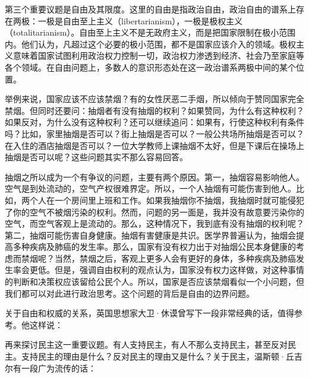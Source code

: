 第三个重要议题是自由及其限度。这里的自由是指政治自由，政治自由的谱系上存在两极：一极是自由至上主义（libertarianism），一极是极权主义（totalitarianism）。自由至上主义不是无政府主义，而是把国家限制在极小范围内。他们认为，凡超过这个必要的极小范围，都不是国家应该介入的领域。极权主义意味着国家试图利用政治权力控制一切，政治权力渗透到经济、社会乃至家庭等各个领域。在自由问题上，多数人的意识形态处在这一政治谱系两极中间的某个位置。

举例来说，国家应该不应该禁烟？有的女性厌恶二手烟，所以倾向于赞同国家完全禁烟。但同时还要问：抽烟者有没有抽烟的权利？如果赞同，为什么有这种权利？如果反对，为什么没有这种权利？还可以继续追问：如果有，行使这种权利有条件吗？比如，家里抽烟是否可以？街上抽烟是否可以？一般公共场所抽烟是否可以？在入住的酒店抽烟是否可以？一位大学教师上课抽烟不太好，但是下课后在操场上抽烟是否可以呢？这些问题其实不那么容易回答。

抽烟之所以成为一个有争议的问题，主要有两个原因。第一，抽烟容易影响他人。空气是到处流动的，空气产权很难界定。所以，一个人抽烟有可能伤害到他人。比如，两个人在一个房间里上班和工作。如果我抽烟你不抽烟，我抽烟时就可能侵犯了你的空气不被烟污染的权利。然而，问题的另一面是，我并没有故意要污染你的空气，而空气客观上是流动的。那么，这种情况下，我到底有没有抽烟的权利呢？第二，抽烟可能伤害自身健康。抽烟有害健康是共识。医学界普遍认为，抽烟会提高多种疾病及肺癌的发生率。那么，国家有没有权力出于对抽烟公民本身健康的考虑而禁烟呢？当然，禁烟之后，客观上更多人会有更好的身体，多种疾病及肺癌发生率会更低。但是，强调自由权利的观点认为，国家没有权力这样做，对这种事情的判断和决策权应该留给公民个人。所以，国家是否应该禁烟看似一个小问题，但我们都可以对此进行政治思考。这个问题的背后是自由的边界问题。

关于自由和权威的关系，英国思想家大卫·休谟曾写下一段非常经典的话，值得参考。他这样说：


再来探讨民主这一重要议题。有人支持民主，有人不那么支持民主，甚至反对民主。支持民主的理由是什么？反对民主的理由又是什么？关于民主，温斯顿·丘吉尔有一段广为流传的话：



